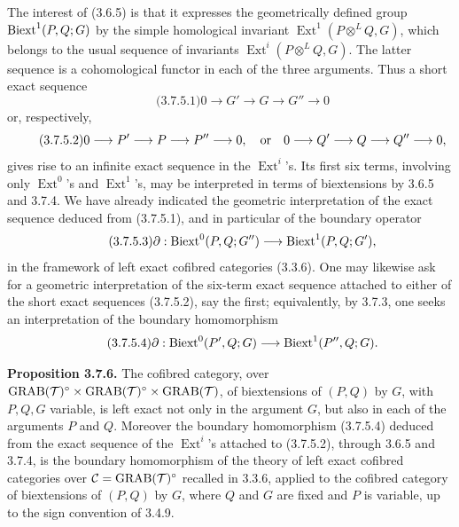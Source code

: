 \documentclass[11pt]{article}
\providecommand{\Ext}{\operatorname{Ext}}
\begin{document}
The interest of (3.6.5) is that it expresses the geometrically defined group \(\operatorname{Biext}^1(P,Q;G)\) by the simple homological invariant \(\Ext^1(P\otimes^L Q,G)\), which belongs to the usual sequence of invariants \(\Ext^i(P\otimes^L Q,G)\).  The latter sequence is a cohomological functor in each of the three arguments.  Thus a short exact sequence
\begin{equation}\qquad\text{(3.7.5.1)}
        0\longrightarrow G'\longrightarrow G\longrightarrow G''\longrightarrow 0
\end{equation}
or, respectively,
\begin{equation}\qquad\text{(3.7.5.2)}
        0\longrightarrow P'\longrightarrow P\longrightarrow P''\longrightarrow 0,
        \quad\hbox{or}\quad
        0\longrightarrow Q'\longrightarrow Q\longrightarrow Q''\longrightarrow 0,
\end{equation}
gives rise to an infinite exact sequence in the \(\Ext^i\)'s.  Its first six terms, involving only \(\Ext^0\)'s and \(\Ext^1\)'s, may be interpreted in terms of biextensions by 3.6.5 and 3.7.4.  We have already indicated the geometric interpretation of the exact sequence deduced from (3.7.5.1), and in particular of the boundary operator
\begin{equation}\qquad\text{(3.7.5.3)}
 \partial:\operatorname{Biext}^0(P,Q;G'')\longrightarrow \operatorname{Biext}^1(P,Q;G'),
\end{equation}
in the framework of left exact cofibred categories (3.3.6).  One may likewise ask for a geometric interpretation of the six-term exact sequence attached to either of the short exact sequences (3.7.5.2), say the first; equivalently, by 3.7.3, one seeks an interpretation of the boundary homomorphism
\begin{equation}\qquad\text{(3.7.5.4)}
 \partial:\operatorname{Biext}^0(P',Q;G)\longrightarrow \operatorname{Biext}^1(P'',Q;G).
\end{equation}

\textbf{Proposition 3.7.6.}  The cofibred category, over
\(\operatorname{GRAB}(\mathcal T)^{\circ}\times\operatorname{GRAB}(\mathcal T)^{\circ}\times\operatorname{GRAB}(\mathcal T)\), of biextensions of \((P,Q)\) by \(G\), with \(P,Q,G\) variable, is left exact not only in the argument \(G\), but also in each of the arguments \(P\) and \(Q\).  Moreover the boundary homomorphism (3.7.5.4) deduced from the exact sequence of the \(\Ext^i\)'s attached to (3.7.5.2), through 3.6.5 and 3.7.4, is the boundary homomorphism of the theory of left exact cofibred categories over
\(\mathcal C=\operatorname{GRAB}(\mathcal T)^{\circ}\) recalled in 3.3.6, applied to the cofibred category of biextensions of \((P,Q)\) by \(G\), where \(Q\) and \(G\) are fixed and \(P\) is variable, up to the sign convention of 3.4.9.
\end{document}
